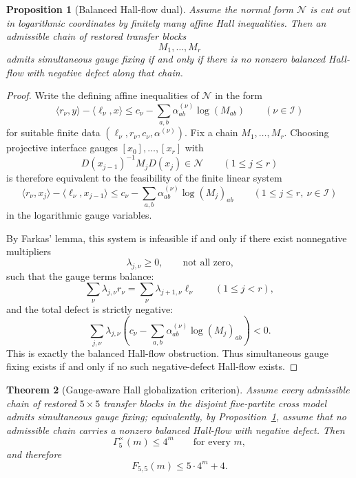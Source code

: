 \documentclass[11pt]{article}
\newtheorem{theorem}{Theorem}[section]
\newtheorem{proposition}[theorem]{Proposition}
\theoremstyle{definition}
\newcommand{\1}{\mathbf{1}}
\begin{document}
\begin{proposition}[Balanced Hall-flow dual]\label{prop:555-balanced-hall-flow}
Assume the normal form $\mathcal N$ is cut out in logarithmic coordinates by finitely many affine Hall inequalities. Then an admissible chain of restored transfer blocks
\[
M_1,\dots,M_r
\]
admits simultaneous gauge fixing if and only if there is no nonzero balanced Hall-flow with negative defect along that chain.
\end{proposition}

\begin{proof}
Write the defining affine inequalities of $\mathcal N$ in the form
\[
\langle r_\nu,y\rangle-\langle \ell_\nu,x\rangle
\le
c_\nu-\sum_{a,b}\alpha_{ab}^{(\nu)}\log (M_{ab})
\qquad (\nu\in \mathcal I)
\]
for suitable finite data $(\ell_\nu,r_\nu,c_\nu,\alpha^{(\nu)})$.
Fix a chain $M_1,\dots,M_r$.
Choosing projective interface gauges $[x_0],\dots,[x_r]$ with
\[
D(x_{j-1})^{-1}M_jD(x_j)\in \mathcal N
\qquad (1\le j\le r)
\]
is therefore equivalent to the feasibility of the finite linear system
\[
\langle r_\nu,x_j\rangle-\langle \ell_\nu,x_{j-1}\rangle
\le
c_\nu-\sum_{a,b}\alpha_{ab}^{(\nu)}\log (M_j)_{ab}
\qquad (1\le j\le r,\ \nu\in \mathcal I)
\]
in the logarithmic gauge variables.

By Farkas' lemma, this system is infeasible if and only if there exist nonnegative multipliers
\[
\lambda_{j,\nu}\ge 0,
\qquad
\text{not all zero,}
\]
such that the gauge terms balance:
\[
\sum_\nu \lambda_{j,\nu} r_\nu
=
\sum_\nu \lambda_{j+1,\nu}\ell_\nu
\qquad (1\le j<r),
\]
and the total defect is strictly negative:
\[
\sum_{j,\nu}\lambda_{j,\nu}
\left(
c_\nu-\sum_{a,b}\alpha_{ab}^{(\nu)}\log (M_j)_{ab}
\right)
<0.
\]
This is exactly the balanced Hall-flow obstruction.
Thus simultaneous gauge fixing exists if and only if no such negative-defect Hall-flow exists.
\end{proof}

\begin{theorem}[Gauge-aware Hall globalization criterion]\label{thm:555-gauge-aware-globalization}
Assume every admissible chain of restored $5\times 5$ transfer blocks in the disjoint five-partite cross model admits simultaneous gauge fixing; equivalently, by Proposition~\ref{prop:555-balanced-hall-flow}, assume that no admissible chain carries a nonzero balanced Hall-flow with negative defect.
Then
\[
\Gamma_5^\times(m)\le 4^m
\qquad\text{for every }m,
\]
and therefore
\[
F_{5,5}(m)\le 5\cdot 4^m+4.
\]
\end{theorem}
\end{document}
